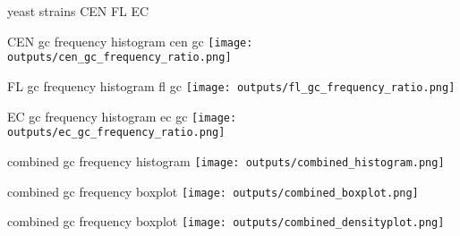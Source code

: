 \documentclass{beamer}
\begin{document}
\begin{frame} {yeast strains}
    CEN
    FL
    EC
\end{frame}

\begin{frame} {CEN gc frequency histogram}
    cen gc
    \texttt{[image: outputs/cen\_gc\_frequency\_ratio.png]}
\end{frame}

\begin{frame} {FL gc frequency histogram}
    fl gc
    \texttt{[image: outputs/fl\_gc\_frequency\_ratio.png]}
\end{frame}

\begin{frame} {EC gc frequency histogram}
    ec gc
    \texttt{[image: outputs/ec\_gc\_frequency\_ratio.png]}
\end{frame}

\begin{frame} {combined gc frequency histogram}
    \texttt{[image: outputs/combined\_histogram.png]}
\end{frame}

\begin{frame} {combined gc frequency boxplot}
    \texttt{[image: outputs/combined\_boxplot.png]}
\end{frame}

\begin{frame} {combined gc frequency boxplot}
    \texttt{[image: outputs/combined\_densityplot.png]}
\end{frame}
\end{document}
